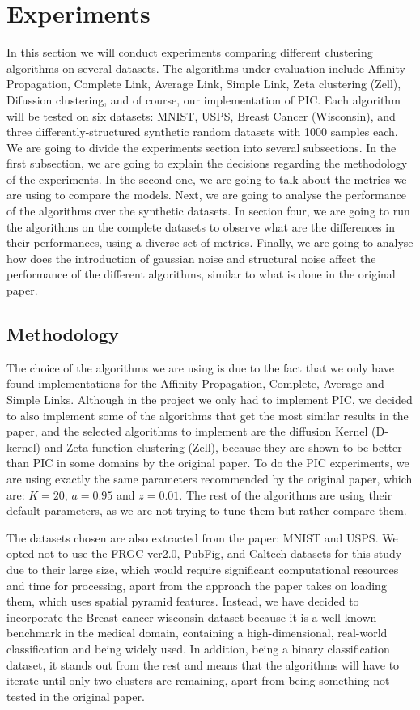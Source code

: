 \documentclass[
	10pt,
	parskip=half-,	
	paper=a4,
	english
	]{scrartcl}
\begin{document}
\section {Experiments}

In this section we will conduct experiments comparing different clustering algorithms on several datasets. The algorithms under evaluation include Affinity Propagation, Complete Link, Average Link, Simple Link, Zeta clustering (Zell), Difussion clustering, and of course, our implementation of PIC. Each algorithm will be tested on six datasets: MNIST, USPS, Breast Cancer (Wisconsin), and three differently-structured synthetic random datasets with 1000 samples each. We are going to divide the experiments section into several subsections. In the first subsection, we are going to explain the decisions regarding the methodology of the experiments. In the second one, we are going to talk about the metrics we are using to compare the models. Next, we are going to analyse the performance of the algorithms over the synthetic datasets. In section four, we are going to run the algorithms on the complete datasets to observe what are the differences in their performances, using a diverse set of metrics. Finally, we are going to analyse how does the introduction of gaussian noise and structural noise affect the performance of the different algorithms, similar to what is done in the original paper.

\subsection{Methodology}

The choice of the algorithms we are using is due to the fact that we only have found implementations for the Affinity Propagation, Complete, Average and Simple Links. Although in the project we only had to implement PIC, we decided to also implement some of the algorithms that get the most similar results in the paper, and the selected algorithms to implement are the diffusion Kernel (D-kernel) and Zeta function clustering (Zell), because they are shown to be better than PIC in some domains by the original paper. To do the PIC experiments, we are using exactly the same parameters recommended by the original paper, which are: \(K=20\), \(a=0.95\) and \(z=0.01\). The rest of the algorithms are using their default parameters, as we are not trying to tune them but rather compare them.

The datasets chosen are also extracted from the paper: MNIST and USPS. We opted not to use the FRGC ver2.0, PubFig, and Caltech datasets for this study due to their large size, which would require significant computational resources and time for processing, apart from the approach the paper takes on loading them, which uses spatial pyramid features. Instead, we have decided to incorporate the Breast-cancer wisconsin dataset because it is a well-known benchmark in the medical domain, containing a high-dimensional, real-world classification and being widely used. In addition, being a binary classification dataset, it stands out from the rest and means that the algorithms will have to iterate until only two clusters are remaining, apart from being something not tested in the original paper.
\end{document}
